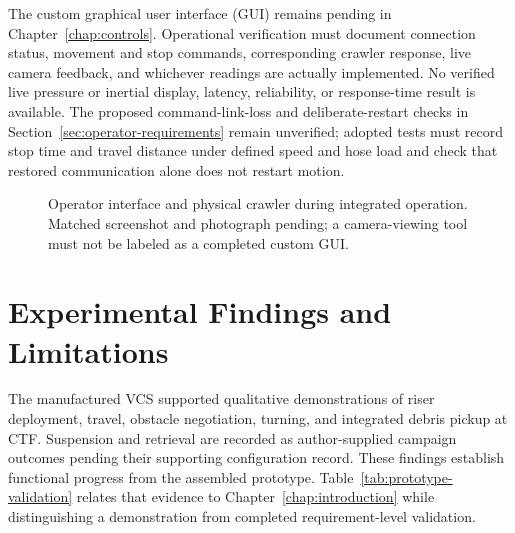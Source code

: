 The custom graphical user interface (GUI) remains pending in Chapter~\ref{chap:controls}. Operational verification must document connection status, movement and stop commands, corresponding crawler response, live camera feedback, and whichever readings are actually implemented. No verified live pressure or inertial display, latency, reliability, or response-time result is available. The proposed command-link-loss and deliberate-restart checks in Section~\ref{sec:operator-requirements} remain unverified; adopted tests must record stop time and travel distance under defined speed and hose load and check that restored communication alone does not restart motion.

\begin{figure}[htbp]\centering
{}\hfill
{}
\caption{Operator interface and physical crawler during integrated operation. Matched screenshot and photograph pending; a camera-viewing tool must not be labeled as a completed custom GUI.}
\label{fig:validation-interface}
\end{figure}

\section{Experimental Findings and Limitations}
\label{sec:validation-findings}
The manufactured VCS supported qualitative demonstrations of riser deployment, travel, obstacle negotiation, turning, and integrated debris pickup at CTF. Suspension and retrieval are recorded as author-supplied campaign outcomes pending their supporting configuration record. These findings establish functional progress from the assembled prototype. Table~\ref{tab:prototype-validation} relates that evidence to Chapter~\ref{chap:introduction} while distinguishing a demonstration from completed requirement-level validation.

